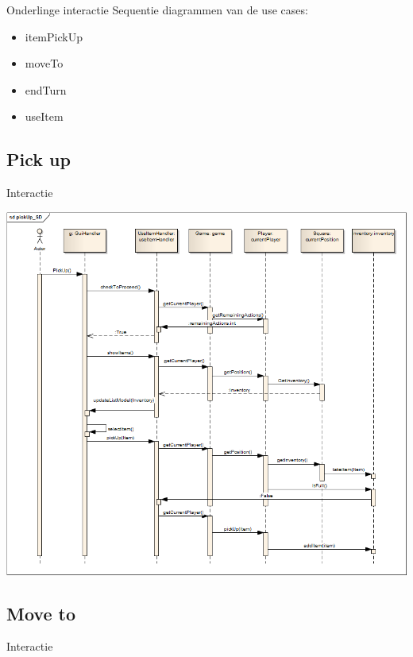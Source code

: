 \documentclass[t]{beamer}
\begin{document}
\begin{frame}{Onderlinge interactie}
Sequentie diagrammen van de use cases:
\begin{itemize}
	\item itemPickUp
	\item moveTo
	\item endTurn
	\item useItem
\end{itemize}
\end{frame}

\subsection{Pick up}
\begin{frame}{Interactie}
\begin{multicols}{2}
\tableofcontents[currentsection]
\end{multicols}
\end{frame}

\begin{frame}[plain]
\begin{center}
\includegraphics[width= 0.90\linewidth]{../uml/pickup_SD.png}
\end{center}
\end{frame}

\subsection{Move to}
\begin{frame}{Interactie}
\begin{multicols}{2}
\tableofcontents[currentsection]
\end{multicols}
\end{frame}
\end{document}
